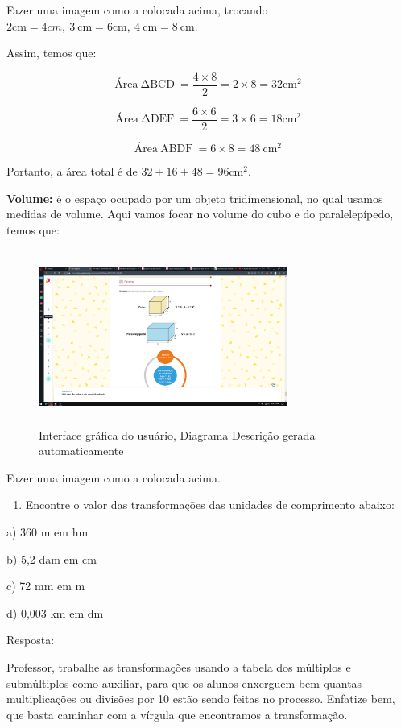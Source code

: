 Fazer uma imagem como a colocada acima, trocando
\(2\text{cm} = 4cm,\ 3\ \text{cm} = 6\text{cm},\ 4\ \text{cm} = 8\ \text{cm}\).

Assim, temos que:

\[Á\text{rea}\ \mathrm{\Delta}\text{BCD}\  = \frac{4 \times 8}{2} = 2 \times 8 = 32\text{cm}^2\ \]

\[Á\text{rea}\ \mathrm{\Delta}\text{DEF}\  = \frac{6 \times 6}{2} = 3 \times 6 = 18\text{cm}^2\ \]

\[Á\text{rea}\ \text{ABDF}\  = 6 \times 8 = 48\ \text{cm}^2\ \]

Portanto, a área total é de \(32 + 16 + 48 = 96\text{cm}^2\).

\textbf{{Volume:}} é o espaço ocupado por um objeto tridimensional, no
qual usamos medidas de volume. Aqui vamos focar no volume do cubo e do
paralelepípedo, temos que:

\begin{figure}
\centering
\includegraphics[width=3.20778in,height=2.25733in]{./imgSAEB_7_MAT/media/image85.png}
\caption{Interface gráfica do usuário, Diagrama Descrição gerada
automaticamente}
\end{figure}

Fazer uma imagem como a colocada acima.


\begin{enumerate}
\def\labelenumi{\arabic{enumi})}
\tightlist
\item
  Encontre o valor das transformações das unidades de comprimento
  abaixo:
\end{enumerate}

a) 360 m em hm

b) 5,2 dam em cm

c) 72 mm em m

d) 0,003 km em dm

Resposta:

Professor, trabalhe as transformações usando a tabela dos múltiplos e
submúltiplos como auxiliar, para que os alunos enxerguem bem quantas
multiplicações ou divisões por 10 estão sendo feitas no processo.
Enfatize bem, que basta caminhar com a vírgula que encontramos a
transformação.

